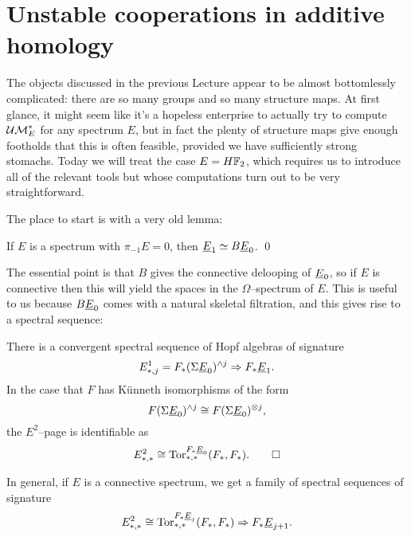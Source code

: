 \section{Unstable cooperations in additive homology}\label{UnstableSteenrodCoops}

The objects discussed in the previous Lecture appear to be almost bottomlessly complicated: there are so many groups and so many structure maps.  At first glance, it might seem like it's a hopeless enterprise to actually try to compute $\mathcal{UM}_{E}^*$ for any spectrum $E$, but in fact the plenty of structure maps give enough footholds that this is often feasible, provided we have sufficiently strong stomachs.  Today we will treat the case $E = H\mathbb F_2$, which requires us to introduce all of the relevant tools but whose computations turn out to be very straightforward.

The place to start is with a very old lemma:
\begin{lemma}
If $E$ is a spectrum with $\pi_{-1} E = 0$, then $\underline{\smash{E}}_{1} \simeq B\underline{\smash{E}}_{0}$. \qed
\end{lemma}
\noindent The essential point is that $B$ gives the connective delooping of $\underline{\smash{E}}_{0}$, so if $E$ is connective then this will yield the spaces in the $\Omega$--spectrum of $E$.  This is useful to us because $B\underline{\smash{E}}_{0}$ comes with a natural skeletal filtration, and this gives rise to a spectral sequence:
\begin{corollary}
There is a convergent spectral sequence of Hopf algebras of signature \[E^1_{*, j} = F_*(\Sigma \underline{\smash{E}}_{0})^{\wedge j} \Rightarrow F_* \underline{\smash{E}}_{1}.\]  In the case that $F$ has K\"unneth isomorphisms of the form \[F(\Sigma \underline{\smash{E}}_{0})^{\wedge j} \cong F(\Sigma \underline{\smash{E}}_{0})^{\otimes j},\] the $E^2$--page is identifiable as \[E^2_{*, *} \cong \operatorname{Tor}^{F_* \underline{\smash{E}}_{0}}_{*, *}(F_*, F_*). \qed\]
\end{corollary}
\noindent In general, if $E$ is a connective spectrum, we get a family of spectral sequences of signature \[E^2_{*, *} \cong \operatorname{Tor}^{F_* \underline{\smash{E}}_{j}}_{*, *}(F_*, F_*) \Rightarrow F_* \underline{\smash{E}}_{j+1}.\]

